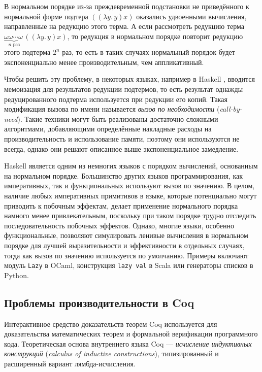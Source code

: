 \documentclass[../diploma.tex]{subfiles}
\begin{document}
В нормальном порядке из-за преждевременной подстановки не приведённого к нормальной форме подтера $((\lambda y.\, y) x)$ оказались удвоенными вычисления, направленные на редукцию этого терма. А если рассмотреть редукцию терма $\underbrace{\omega\omega\cdots\omega\,}_\text{$n$ раз}((\lambda y.\, y) x)$, то редукция в нормальном порядке повторит редукцию этого подтерма $2^n$ раз, то есть в таких случаях нормальный порядок будет экспоненциально менее производительным, чем аппликативный.

Чтобы решить эту проблему, в некоторых языках, например в Haskell \cite{haskell}, вводится мемоизация для результатов редукции подтермов, то есть результат однажды редуцированного подтерма используется при редукции его копий. Такая модификация вызова по имени называется \textit{вызов по необходимости} (\textit{call-by-need}). Такие техники могут быть реализованы достаточно сложными алгоритмами, добавляющими определённые накладные расходы на производительность и использование памяти, поэтому они используются не всегда, однако они решают описанное выше экспоненциальное замедление.

Haskell является одним из немногих языков с порядком вычислений, основанным на нормальном порядке. Большинство других языков программирования, как императивных, так и функциональных используют вызов по значению. В целом, наличие любых императивных примитивов в языке, которые потенциально могут приводить к побочным эффектам, делает применение нормального порядка намного менее привлекательным, поскольку при таком порядке трудно отследить последовательность побочных эффектов. Однако, многие языки, особенно функциональные, позволяют симулировать ленивые вычисления в нормальном порядке для лучшей выразительности и эффективности в отдельных случаях, тогда как вызов по значению используется по умолчанию. Примеры включают модуль \texttt{Lazy} в OCaml, конструкция \texttt{lazy val} в Scala или генераторы списков в Python.

\subsection{Проблемы производительности в Coq} \label{coq_problems}

Интерактивное средство доказательств теорем Coq используется для доказательства математических теорем и формальной верификации программного кода. Теоретическая основа внутреннего языка Coq --- \textit{исчисление индуктивных конструкций} (\textit{calculus of inductive constructions}), типизированный и расширенный вариант лямбда-исчисления.
\end{document}
